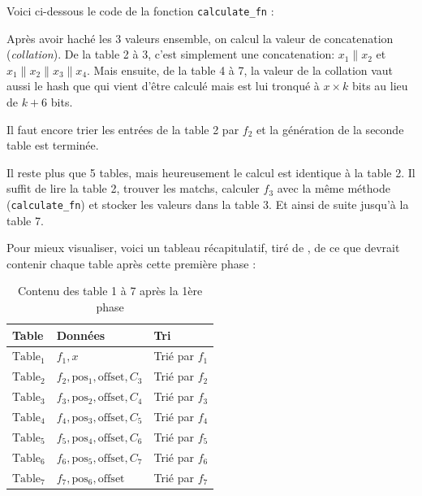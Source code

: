 Voici ci-dessous le code de la fonction \verb|calculate_fn| :


Après avoir haché les 3 valeurs ensemble, on calcul la valeur de concatenation (\emph{collation}). De la table 2 à 3, c'est simplement une concatenation: $x_1\|x_2$ et $x_1\|x_2\|x_3\|x_4$. Mais ensuite, de la table 4 à 7, la valeur de la collation vaut aussi le hash que qui vient d'être calculé mais est lui tronqué à $x \times k$ bits au lieu de $k + 6$ bits.

Il faut encore trier les entrées de la table 2 par $f_2$ et la génération de la seconde table est terminée.


Il reste plus que 5 tables, mais heureusement le calcul est identique à la table 2. Il suffit de lire la table 2, trouver les matchs, calculer $f_3$ avec la même méthode (\verb|calculate_fn|) et stocker les valeurs dans la table 3. Et ainsi de suite jusqu'à la table 7.

Pour mieux visualiser, voici un tableau récapitulatif, tiré de \cite{chia:construction}, de ce que devrait contenir chaque table après cette première phase :

\begin{table}[H]
  \centering
  \begin{tabular}{l l l}
    \textbf{Table} & \textbf{Données} & \textbf{Tri} \\
    \hline
    \hline
    $\mathrm{Table_1}$ & $f_1,x$ & Trié par $f_1$ \\
    \hline
    $\mathrm{Table_2}$ & $f_2,\mathrm{pos_1},\mathrm{offset},C_3$ & Trié par $f_2$ \\
    \hline
    $\mathrm{Table_3}$ & $f_3,\mathrm{pos_2},\mathrm{offset},C_4$ & Trié par $f_3$ \\
    \hline
    $\mathrm{Table_4}$ & $f_4,\mathrm{pos_3},\mathrm{offset},C_5$ & Trié par $f_4$ \\
    \hline
    $\mathrm{Table_5}$ & $f_5,\mathrm{pos_4},\mathrm{offset},C_6$ & Trié par $f_5$ \\
    \hline
    $\mathrm{Table_6}$ & $f_6,\mathrm{pos_5},\mathrm{offset},C_7$ & Trié par $f_6$ \\
    \hline
    $\mathrm{Table_7}$ & $f_7,\mathrm{pos_6},\mathrm{offset}$ & Trié par $f_7$ \\
    \hline
  \end{tabular}
  \caption{Contenu des table 1 à 7 après la 1ère phase}
\end{table}

